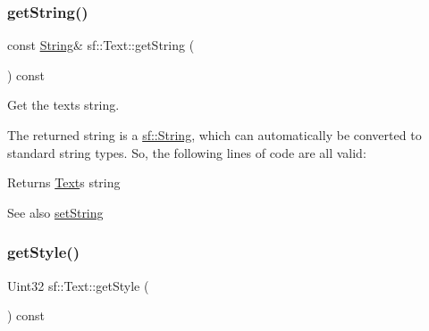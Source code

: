 \subsubsection{\texorpdfstring{getString()}{getString()}}
{\footnotesize\ttfamily const \mbox{\hyperlink{classsf_1_1_string}{String}}\& sf\+::\+Text\+::get\+String (\begin{DoxyParamCaption}{ }\end{DoxyParamCaption}) const}



Get the text\textquotesingle{}s string. 

The returned string is a \mbox{\hyperlink{classsf_1_1_string}{sf\+::\+String}}, which can automatically be converted to standard string types. So, the following lines of code are all valid\+: 
\begin{DoxyCode}{0}
\end{DoxyCode}


\begin{DoxyReturn}{Returns}
\mbox{\hyperlink{classsf_1_1_text}{Text}}\textquotesingle{}s string
\end{DoxyReturn}
\begin{DoxySeeAlso}{See also}
\mbox{\hyperlink{classsf_1_1_text_a7d3b3359f286fd9503d1ced25b7b6c33}{set\+String}} \begin{DoxyVerb}\end{DoxyVerb}
 
\end{DoxySeeAlso}
\mbox{\label{classsf_1_1_text_a0da79b0c057f4bb51592465a205c35d7}} 
\subsubsection{\texorpdfstring{getStyle()}{getStyle()}}
{\footnotesize\ttfamily Uint32 sf\+::\+Text\+::get\+Style (\begin{DoxyParamCaption}{ }\end{DoxyParamCaption}) const}



